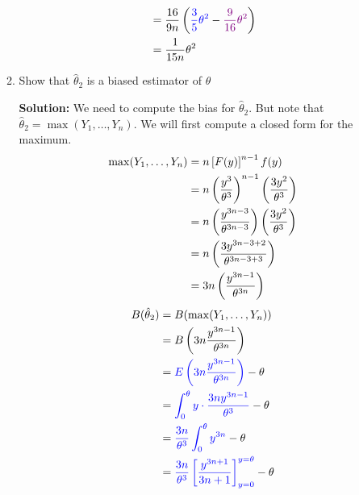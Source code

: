 \documentclass[12pt]{article}
\newcommand{\pars}[1]{\left( {#1} \right) }
\newcommand{\brac}[1]{\left[ {#1} \right] }
\newcommand{\E}[1]{E\left( {#1} \right)}
\begin{document}
\begin{enumerate}
\begin{enumerate}
\begin{mybox}
\begin{align}
                    &= \frac{16}{9n}  \pars{ \color{blue} \frac{3}{5}\theta^2 \color{black}-\color{violet}\frac{9}{16}\theta^2 \color{black}}\notag\\
                    &= \frac{1}{15n}\theta^2 \notag
                \end{align}
                \begin{center}\color{magenta} \color{black}\end{center}
        \end{mybox}
        
        \newpage
        \item 
        Show that $\hat{\theta}_2$ is a biased estimator of $\theta$
        \begin{mybox}
            \textbf{Solution: } We need to compute the bias for $\hat{\theta}_2$. But note that $\hat{\theta}_2 = \operatorname{max}(Y_1, \dots, Y_n)$. We will first compute a closed form for the maximum.
            \begin{align}
                \operatorname{max}(Y_1, \dots, Y_n) &= n \brac{F(y)}^{n-1}f(y) \notag\\
                &= n \pars{\frac{y^3}{\theta^3}}^{n-1}\pars{\frac{3y^2}{\theta^3}} \notag\\
                &= n \pars{\frac{y^{3n-3}}{\theta^{3n-3}}}\pars{\frac{3y^2}{\theta^3}} \notag\\
                &= n \pars{\frac{3y^{3n-3+2}}{\theta^{3n-3+3}}}\notag\\
                &= 3n \pars{\frac{y^{3n-1}}{\theta^{3n}}}\notag
            \end{align}
            \begin{align}
            B(\hat{\theta}_2) &= B(\operatorname{max}(Y_1, \dots, Y_n)) \notag\\
            &= B\pars{3n \frac{y^{3n-1}}{\theta^{3n}}} \notag\\
            &= \color{blue}\E{3n \frac{y^{3n-1}}{\theta^{3n}}}\color{black} - \theta \notag\\
            &= \color{blue}\int_0^{\theta} y \cdot \frac{3ny^{3n-1}}{\theta^3}\color{black} - \theta \notag\\
            &= \color{blue}\frac{3n}{\theta^3}\int_0^{\theta} y^{3n}\color{black} - \theta \notag\\
            &= \color{blue}\frac{3n}{\theta^3} \brac{\frac{y^{3n+1}}{3n+1}}_{y=0}^{y=\theta}\color{black} - \theta \notag\\

\end{align}
\end{mybox}
\end{enumerate}
\end{enumerate}
\end{document}
